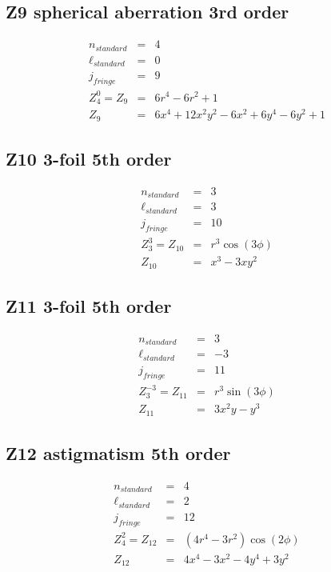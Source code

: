 \documentclass[10pt]{article}
\begin{document}
  \subsection{Z9 spherical aberration 3rd order}
    \begin{subequations}
    \begin{eqnarray}
        n_{standard} &=&4\\
        \ell_{standard} &=&0\\
        j_{fringe} &=&9\\
        Z_{4}^{0} = Z_{9} &=& 6 r^{4} - 6 r^{2} + 1\\
        Z_{9} &=& 6 x^{4} + 12 x^{2} y^{2} - 6 x^{2} + 6 y^{4} - 6 y^{2} + 1
    \end{eqnarray}
    \end{subequations}
  \subsection{Z10 3-foil 5th order}
    \begin{subequations}
    \begin{eqnarray}
        n_{standard} &=&3\\
        \ell_{standard} &=&3\\
        j_{fringe} &=&10\\
        Z_{3}^{3} = Z_{10} &=& r^{3} \cos{\left(3 \phi \right)}\\
        Z_{10} &=& x^{3} - 3 x y^{2}
    \end{eqnarray}
    \end{subequations}
  \subsection{Z11 3-foil 5th order}
    \begin{subequations}
    \begin{eqnarray}
        n_{standard} &=&3\\
        \ell_{standard} &=&-3\\
        j_{fringe} &=&11\\
        Z_{3}^{-3} = Z_{11} &=& r^{3} \sin{\left(3 \phi \right)}\\
        Z_{11} &=& 3 x^{2} y - y^{3}
    \end{eqnarray}
    \end{subequations}
  \subsection{Z12 astigmatism 5th order}
    \begin{subequations}
    \begin{eqnarray}
        n_{standard} &=&4\\
        \ell_{standard} &=&2\\
        j_{fringe} &=&12\\
        Z_{4}^{2} = Z_{12} &=& \left(4 r^{4} - 3 r^{2}\right) \cos{\left(2 \phi \right)}\\
        Z_{12} &=& 4 x^{4} - 3 x^{2} - 4 y^{4} + 3 y^{2}
    \end{eqnarray}
    \end{subequations}
\end{document}
